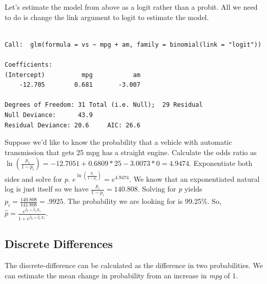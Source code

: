 \documentclass[]{book}
\newenvironment{Shaded}{\begin{snugshade}}{\end{snugshade}}
\newcommand{\DataTypeTok}[1]{\textcolor[rgb]{0.13,0.29,0.53}{#1}}
\newcommand{\KeywordTok}[1]{\textcolor[rgb]{0.13,0.29,0.53}{\textbf{#1}}}
\newcommand{\NormalTok}[1]{#1}
\newcommand{\OperatorTok}[1]{\textcolor[rgb]{0.81,0.36,0.00}{\textbf{#1}}}
\newcommand{\StringTok}[1]{\textcolor[rgb]{0.31,0.60,0.02}{#1}}
\begin{document}
Let's estimate the model from above as a logit rather than a probit. All we need to do is change the link argument to logit to estimate the model.

\begin{Shaded}
\end{Shaded}

\begin{verbatim}

Call:  glm(formula = vs ~ mpg + am, family = binomial(link = "logit"))

Coefficients:
(Intercept)          mpg           am  
    -12.705        0.681       -3.007  

Degrees of Freedom: 31 Total (i.e. Null);  29 Residual
Null Deviance:      43.9 
Residual Deviance: 20.6     AIC: 26.6
\end{verbatim}

Suppose we'd like to know the probability that a vehicle with automatic transmission that gets 25 mpg has a straight engine. Calculate the odds ratio as \(\ln(\frac{p_1}{1-p_i})=-12.7051+0.6809*25-3.0073*0 = 4.9474\). Exponentiate both sides and solve for \emph{p}. \(e^{\ln(\frac{p_i}{1-p_i})} = e^{4.9474}\). We know that an exponentiated natural log is just itself so we have \(\frac{p_i}{1-p_i}=140.808\). Solving for \emph{p} yields \(p_i=\frac{140.808}{141.808}=.9925\). The probability we are looking for is 99.25\%. So,
\(\hat p=\frac{e^{\hat\beta_0+\hat\beta_1X_1}}{1 + e^{\hat\beta_0+\hat\beta_1X_1}}\).

\hypertarget{discrete-differences}{%
\subsection{Discrete Differences}\label{discrete-differences}}

The discrete-difference can be calculated as the difference in two probabilities. We can estimate the mean change in probability from an increase in \emph{mpg} of 1.
\end{document}
